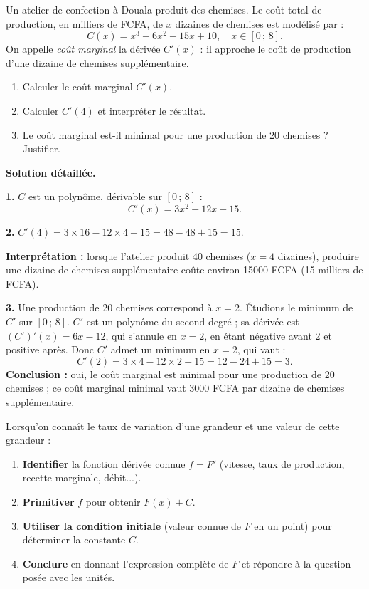 \documentclass[11pt]{article}
\begin{document}
\begin{exoresolu}
Un atelier de confection à Douala produit des chemises. Le coût total de production, en milliers de FCFA, de $x$ dizaines de chemises est modélisé par :
\[ C(x) = x^3 - 6x^2 + 15x + 10, \quad x \in [0\,;\,8]. \]
On appelle \emph{coût marginal} la dérivée $C'(x)$ : il approche le coût de production d'une dizaine de chemises supplémentaire.
\begin{enumerate}
\item Calculer le coût marginal $C'(x)$.
\item Calculer $C'(4)$ et interpréter le résultat.
\item Le coût marginal est-il minimal pour une production de 20 chemises ? Justifier.
\end{enumerate}
\tcblower
\textbf{Solution détaillée.}

\textbf{1.} $C$ est un polynôme, dérivable sur $[0\,;\,8]$ :
\[ C'(x) = 3x^2 - 12x + 15. \]

\textbf{2.} $C'(4) = 3 \times 16 - 12 \times 4 + 15 = 48 - 48 + 15 = 15$.

\textbf{Interprétation :} lorsque l'atelier produit 40 chemises ($x = 4$ dizaines), produire une dizaine de chemises supplémentaire coûte environ \num{15000} FCFA (15 milliers de FCFA).

\textbf{3.} Une production de 20 chemises correspond à $x = 2$. Étudions le minimum de $C'$ sur $[0\,;\,8]$. $C'$ est un polynôme du second degré ; sa dérivée est $(C')'(x) = 6x - 12$, qui s'annule en $x = 2$, en étant négative avant 2 et positive après. Donc $C'$ admet un minimum en $x = 2$, qui vaut :
\[ C'(2) = 3 \times 4 - 12 \times 2 + 15 = 12 - 24 + 15 = 3. \]
\textbf{Conclusion :} oui, le coût marginal est minimal pour une production de 20 chemises ; ce coût marginal minimal vaut \num{3000} FCFA par dizaine de chemises supplémentaire.
\end{exoresolu}

\begin{methode}
Lorsqu'on connaît le taux de variation d'une grandeur et une valeur de cette grandeur :
\begin{enumerate}
\item \textbf{Identifier} la fonction dérivée connue $f = F'$ (vitesse, taux de production, recette marginale, débit...).
\item \textbf{Primitiver} $f$ pour obtenir $F(x) + C$.
\item \textbf{Utiliser la condition initiale} (valeur connue de $F$ en un point) pour déterminer la constante $C$.
\item \textbf{Conclure} en donnant l'expression complète de $F$ et répondre à la question posée avec les unités.
\end{enumerate}
\end{methode}
\end{document}
